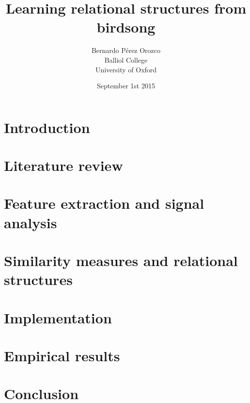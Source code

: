 \documentclass[pdftex,12pt,a4paper]{report}
\title{Learning relational structures from birdsong}
\author{Bernardo Pérez Orozco\\Balliol College\\University of Oxford}
\date{ September 1st 2015 }
\begin{document}
 

\chapter{Introduction}

 
\chapter{Literature review}



\chapter{Feature extraction and signal analysis}
 

 
\chapter{Similarity measures and relational structures}



\chapter{Implementation}



\chapter{Empirical results}



\chapter{Conclusion}






\end{document}
